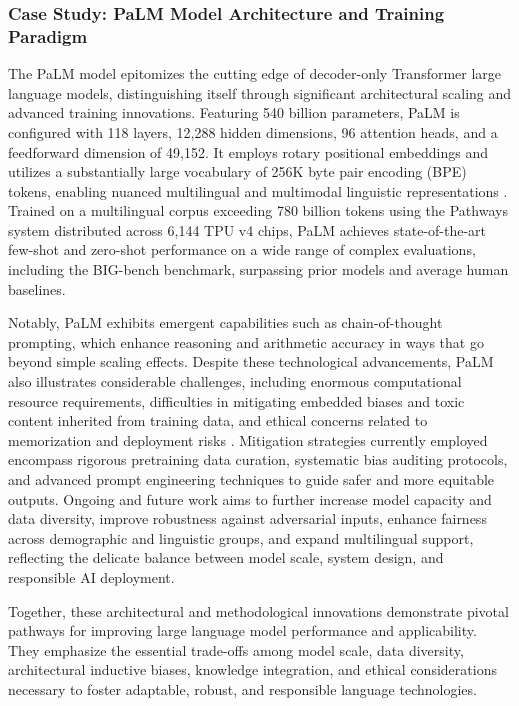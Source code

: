 \documentclass[sigconf]{acmart}
\begin{document}
\subsubsection{Case Study: PaLM Model Architecture and Training Paradigm}

The PaLM model epitomizes the cutting edge of decoder-only Transformer large language models, distinguishing itself through significant architectural scaling and advanced training innovations. Featuring 540 billion parameters, PaLM is configured with 118 layers, 12,288 hidden dimensions, 96 attention heads, and a feedforward dimension of 49,152. It employs rotary positional embeddings and utilizes a substantially large vocabulary of 256K byte pair encoding (BPE) tokens, enabling nuanced multilingual and multimodal linguistic representations \cite{ref7}. Trained on a multilingual corpus exceeding 780 billion tokens using the Pathways system distributed across 6,144 TPU v4 chips, PaLM achieves state-of-the-art few-shot and zero-shot performance on a wide range of complex evaluations, including the BIG-bench benchmark, surpassing prior models and average human baselines.

Notably, PaLM exhibits emergent capabilities such as chain-of-thought prompting, which enhance reasoning and arithmetic accuracy in ways that go beyond simple scaling effects. Despite these technological advancements, PaLM also illustrates considerable challenges, including enormous computational resource requirements, difficulties in mitigating embedded biases and toxic content inherited from training data, and ethical concerns related to memorization and deployment risks \cite{ref7}. Mitigation strategies currently employed encompass rigorous pretraining data curation, systematic bias auditing protocols, and advanced prompt engineering techniques to guide safer and more equitable outputs. Ongoing and future work aims to further increase model capacity and data diversity, improve robustness against adversarial inputs, enhance fairness across demographic and linguistic groups, and expand multilingual support, reflecting the delicate balance between model scale, system design, and responsible AI deployment.

Together, these architectural and methodological innovations demonstrate pivotal pathways for improving large language model performance and applicability. They emphasize the essential trade-offs among model scale, data diversity, architectural inductive biases, knowledge integration, and ethical considerations necessary to foster adaptable, robust, and responsible language technologies.
\end{document}
